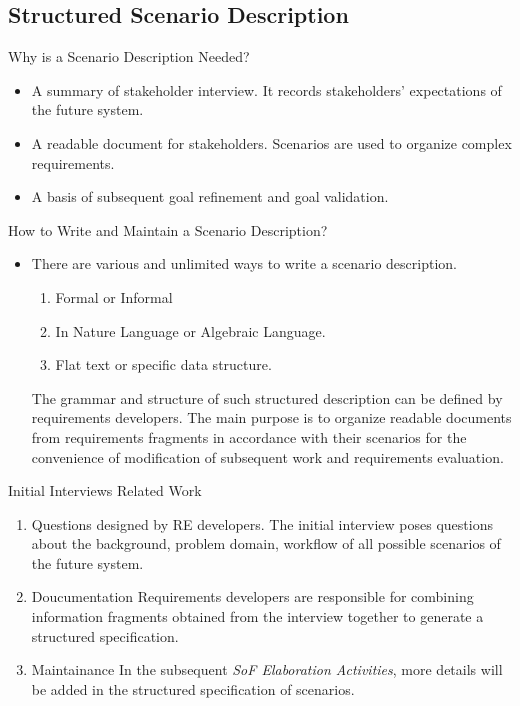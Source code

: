 \documentclass{beamer}
\begin{document}
\subsection{Structured Scenario Description}
\begin{frame}{Why is a Scenario Description Needed?}
  \begin{itemize}
  \item
    A summary of stakeholder interview.  It records stakeholders' expectations of the future system.
  \item
    A readable document for stakeholders.   Scenarios are used to organize complex requirements.  
  \item
    A basis of subsequent goal refinement and goal validation. 
  \end{itemize}
\end{frame}

\begin{frame}{How to Write and Maintain a Scenario Description?}
  \footnotesize{
  \begin{itemize}
  \item
    There are various and unlimited ways to write a scenario description. 
    \begin{enumerate}
    \item Formal or Informal
    \item In Nature Language or Algebraic Language.
    \item Flat text or specific data structure.
    \end{enumerate}
    The grammar and structure of such structured description can be defined by requirements developers. The main purpose is to organize readable documents from requirements fragments in accordance with their scenarios for the convenience of modification of subsequent work and requirements evaluation.
  \end{itemize}
  }
\end{frame}

\begin{frame}{Initial Interviews Related Work}
  \begin{enumerate}
  \item Questions designed by RE developers.
    The initial interview poses questions about the background, problem domain, workflow of all possible scenarios of the future system.
  \item Doucumentation 
        Requirements developers are responsible for combining information fragments obtained from the interview together to generate a structured specification.
  \item Maintainance 
        In the subsequent \emph{SoF Elaboration Activities}, more details will be added in the structured specification of scenarios.
  \end{enumerate}
\end{frame}
\end{document}
